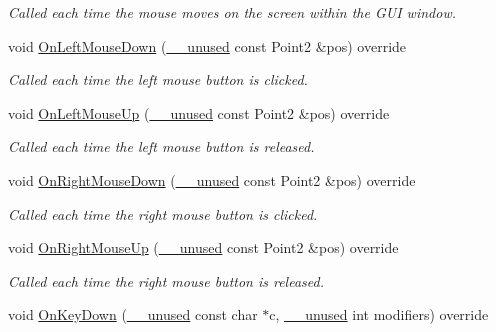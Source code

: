 \begin{DoxyCompactItemize}
\begin{DoxyCompactList}\small\item\em Called each time the mouse moves on the screen within the G\+UI window. \end{DoxyCompactList}\item 
void \mbox{\hyperlink{class_graphics_arena_viewer_adf2fb01c3ca8b1774f031d68616b288c}{On\+Left\+Mouse\+Down}} (\mbox{\hyperlink{common_8h_a2e3484535ee610c8e19e9859563abe48}{\+\_\+\+\_\+unused}} const Point2 \&pos) override
\begin{DoxyCompactList}\small\item\em Called each time the left mouse button is clicked. \end{DoxyCompactList}\item 
void \mbox{\hyperlink{class_graphics_arena_viewer_abe4f11ab9bfb6055280ddf2b671d7032}{On\+Left\+Mouse\+Up}} (\mbox{\hyperlink{common_8h_a2e3484535ee610c8e19e9859563abe48}{\+\_\+\+\_\+unused}} const Point2 \&pos) override
\begin{DoxyCompactList}\small\item\em Called each time the left mouse button is released. \end{DoxyCompactList}\item 
void \mbox{\hyperlink{class_graphics_arena_viewer_a178a9f09ff241d4dc032b6d0998cc9c6}{On\+Right\+Mouse\+Down}} (\mbox{\hyperlink{common_8h_a2e3484535ee610c8e19e9859563abe48}{\+\_\+\+\_\+unused}} const Point2 \&pos) override
\begin{DoxyCompactList}\small\item\em Called each time the right mouse button is clicked. \end{DoxyCompactList}\item 
void \mbox{\hyperlink{class_graphics_arena_viewer_a5dfa16dca83575e253b6d3ea344f8746}{On\+Right\+Mouse\+Up}} (\mbox{\hyperlink{common_8h_a2e3484535ee610c8e19e9859563abe48}{\+\_\+\+\_\+unused}} const Point2 \&pos) override
\begin{DoxyCompactList}\small\item\em Called each time the right mouse button is released. \end{DoxyCompactList}\item 
void \mbox{\hyperlink{class_graphics_arena_viewer_ab0001d4a3ebde2b1f5b4cb7770824726}{On\+Key\+Down}} (\mbox{\hyperlink{common_8h_a2e3484535ee610c8e19e9859563abe48}{\+\_\+\+\_\+unused}} const char $\ast$c, \mbox{\hyperlink{common_8h_a2e3484535ee610c8e19e9859563abe48}{\+\_\+\+\_\+unused}} int modifiers) override

\end{DoxyCompactItemize}
